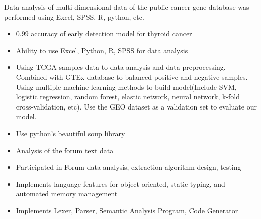 \documentclass{resume}
\begin{document}
Data analysis of multi-dimensional data of the public cancer gene database was performed using Excel, SPSS, R, python, etc.
\begin{itemize}
  \item 0.99 accuracy of early detection model for thyroid cancer
  \item Ability to use Excel, Python, R, SPSS for data analysis
  \item Using TCGA samples data to data analysis and data preprocessing. Combined with GTEx database to balanced positive and negative samples. Using multiple machine learning methods to build model(Include SVM, logistic regression, random forest, elastic network, neural network, k-fold cross-validation, etc). Use the GEO dataset as a validation set to evaluate our model.
\end{itemize}

\begin{itemize}
  \item Use python's beautiful soup library
  \item Analysis of the forum text data
  \item Participated in Forum data analysis, extraction algorithm design, testing
\end{itemize}

\begin{itemize}
  \item Implements language features for object-oriented, static typing, and automated memory management
  \item Implements Lexer, Parser, Semantic Analysis Program, Code Generator
\end{itemize}

\end{document}
